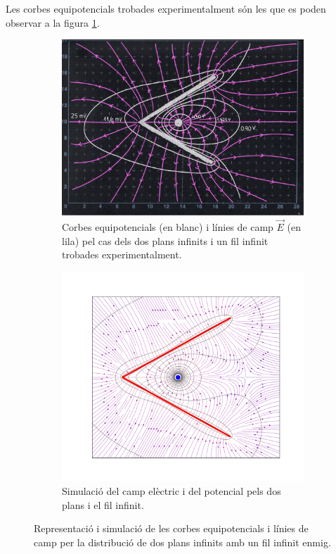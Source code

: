 \documentclass[a4paper,10.5pt]{report}
\begin{document}
Les corbes equipotencials trobades experimentalment són les que es poden observar a la figura \ref{fig:1.4a}.

\begin{figure}[h]
	\centering
	\begin{subfigure}{0.49\linewidth}
		\centering
		\includegraphics[width=\linewidth]{confinventJS}
		\caption{Corbes equipotencials (en blanc) i línies de camp $\vec{E}$ (en lila) pel cas dels dos plans infinits i un fil infinit trobades experimentalment.}
		\label{fig:1.4a}
	\end{subfigure}
	\hfill
	\begin{subfigure}{0.49\linewidth}
		\centering
		\includegraphics[width=\linewidth]{figplacarara}
		\caption{Simulació del camp elèctric i del potencial pels dos plans i el fil infinit.}
		\label{fig:1.4b}
	\end{subfigure}
	\caption{Representació i simulació de les corbes equipotencials i línies de camp per la distribució de dos plans infinits amb un fil infinit enmig.}
	\label{fig:1.4}
\end{figure}
\end{document}
